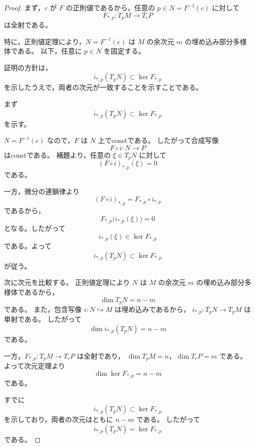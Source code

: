 \documentclass[uplatex,dvipdfmx]{jsarticle}
\theoremstyle{definition}
\begin{document}
\begin{proof}
まず，$c$ が $F$ の正則値であるから，任意の $p\in N=F^{-1}(c)$ に対して
\[
  F_{*,p}:T_pM\to T_cP
\]
は全射である。

特に，正則値定理により，$N=F^{-1}(c)$ は $M$ の余次元 $m$ の埋め込み部分多様体である。
以下，任意に $p\in N$ を固定する。

証明の方針は，
\[
  i_{*,p}(T_pN)\subset \ker F_{*,p}
\]
を示したうえで，両者の次元が一致することを示すことである。

まず
\[
  i_{*,p}(T_pN)\subset \ker F_{*,p}
\]
を示す。

$N=F^{-1}(c)$ なので，$F$ は $N$ 上でconstである。
したがって合成写像
\[
  F\circ i:N\to P
\]
はconstである。
補題より，任意の $\xi\in T_pN$ に対して
\[
  (F\circ i)_{*,p}(\xi)=0
\]
である。

一方，微分の連鎖律より
\[
  (F\circ i)_{*,p}=F_{*,p}\circ i_{*,p}
\]
であるから，
\[
  F_{*,p}\bigl(i_{*,p}(\xi)\bigr)=0
\]
となる。したがって
\[
  i_{*,p}(\xi)\in \ker F_{*,p}
\]
である。よって
\[
  i_{*,p}(T_pN)\subset \ker F_{*,p}
\]
が従う。

次に次元を比較する。
正則値定理により $N$ は $M$ の余次元 $m$ の埋め込み部分多様体であるから，
\[
  \dim T_pN=n-m
\]
である。
また，包含写像 $i:N\hookrightarrow M$ は埋め込みであるから，
$i_{*,p}:T_pN\to T_pM$ は単射である。
したがって
\[
  \dim i_{*,p}(T_pN)=n-m
\]
である。

一方，$F_{*,p}:T_pM\to T_cP$ は全射であり，
$\dim T_pM=n$，$\dim T_cP=m$ である。
よって次元定理より
\[
  \dim \ker F_{*,p}=n-m
\]
である。

すでに
\[
  i_{*,p}(T_pN)\subset \ker F_{*,p}
\]
を示しており，両者の次元はともに $n-m$ である。
したがって
\[
  i_{*,p}(T_pN)=\ker F_{*,p}
\]
である。
\end{proof}
\end{document}
